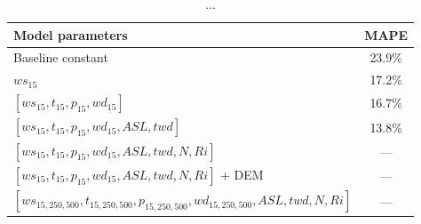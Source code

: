 \begin{table}[h]
    \caption[Model results for different sets of parameters.]{...}
    \label{table:setsOfParams}
    \centering
    \begin{tabular}{lc}
        \toprule
        \textbf{Model parameters} & \textbf{MAPE}\\
        \midrule
        Baseline constant & 23.9\%\\
        $ws_{15}$ & 17.2\%\\
        $[ws_{15}, t_{15}, p_{15}, wd_{15}]$ & 16.7\% \\
        $[ws_{15}, t_{15}, p_{15}, wd_{15}, ASL, twd]$ & 13.8\% \\
        $[ws_{15}, t_{15}, p_{15}, wd_{15}, ASL, twd, N, Ri]$ & ---\\
        $[ws_{15}, t_{15}, p_{15}, wd_{15}, ASL, twd, N, Ri]$ + DEM & ---\\
        $[ws_{15,250,500}, t_{15,250,500}, p_{15,250,500}, wd_{15,250,500}, ASL, twd, N, Ri]$ & --- \\
        \bottomrule
    \end{tabular}
\end{table}